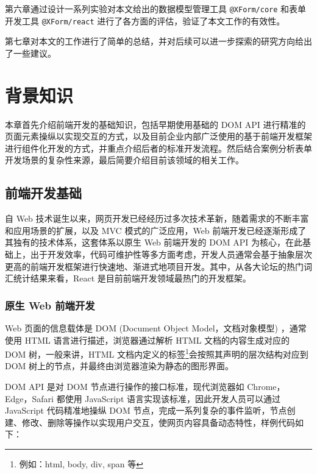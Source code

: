 \documentclass[winfonts,master,twoside]{njuthesis}
\makeatletter
\newcommand{\xform}[1]{\texttt{@XForm/#1}}
\makeatother
\begin{document}
第六章通过设计一系列实验对本文给出的数据模型管理工具 \xform{core} 和表单开发工具 \xform{react} 进行了各方面的评估，验证了本文工作的有效性。

第七章对本文的工作进行了简单的总结，并对后续可以进一步探索的研究方向给出了一些建议。

\chapter{背景知识}

本章首先介绍前端开发的基础知识，包括早期使用基础的 DOM API 进行精准的页面元素操纵以实现交互的方式，以及目前企业内部广泛使用的基于前端开发框架进行组件化开发的方式，并重点介绍后者的标准开发流程。然后结合案例分析表单开发场景的复杂性来源，最后简要介绍目前该领域的相关工作。

\section{前端开发基础}\label{frontend-development-basic}

自 Web 技术诞生以来，网页开发已经经历过多次技术革新，随着需求的不断丰富和应用场景的扩展，以及 MVC 模式的广泛应用，Web 前端开发已经逐渐形成了其独有的技术体系\cite{pop2014designing}，这套体系以原生 Web 前端开发的 DOM API 为核心，在此基础上，出于开发效率，代码可维护性等多方面考虑，开发人员通常会基于抽象层次更高的前端开发框架进行快速地、渐进式地项目开发\cite{xing2019research}。其中，从各大论坛的热门词汇统计结果来看，React 是目前前端开发领域最热门的开发框架\cite{frontend-frameworks-popularity}。

\subsection{原生 Web 前端开发}

Web 页面的信息载体是 DOM (Document Object Model，文档对象模型) \cite{wood1998document}，通常使用 HTML 语言\cite{berners1995hypertext}进行描述，浏览器通过解析 HTML 文档的内容生成对应的 DOM 树，一般来讲，HTML 文档内定义的标签\footnote{例如：html, body, div, span 等}会按照其声明的层次结构对应到 DOM 树上的节点，并最终由浏览器渲染为静态的图形界面\cite{garsiel2011browsers}。

DOM API 是对 DOM 节点进行操作的接口标准，现代浏览器如 Chrome，Edge，Safari 都使用 JavaScript 语言实现该标准，因此开发人员可以通过 JavaScript 代码精准地操纵 DOM 节点，完成一系列复杂的事件监听，节点创建、修改、删除等操作以实现用户交互，使网页内容具备动态特性，样例代码如下：


\end{document}
